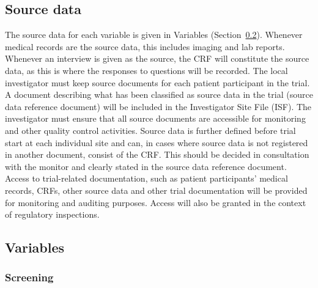 \documentclass[
]{scrartcl}
\begin{document}
\subsection{Source data}\label{source-data}

The source data for each variable is given in Variables
(Section~\ref{sec-variables}). Whenever medical records are the source
data, this includes imaging and lab reports. Whenever an interview is
given as the source, the CRF will constitute the source data, as this is
where the responses to questions will be recorded. The local
investigator must keep source documents for each patient participant in
the trial. A document describing what has been classified as source data
in the trial (source data reference document) will be included in the
Investigator Site File (ISF). The investigator must ensure that all
source documents are accessible for monitoring and other quality control
activities. Source data is further defined before trial start at each
individual site and can, in cases where source data is not registered in
another document, consist of the CRF. This should be decided in
consultation with the monitor and clearly stated in the source data
reference document. Access to trial-related documentation, such as
patient participants' medical records, CRFs, other source data and other
trial documentation will be provided for monitoring and auditing
purposes. Access will also be granted in the context of regulatory
inspections.

\subsection{Variables}\label{sec-variables}

\subsubsection{Screening}\label{screening-2}
\end{document}
